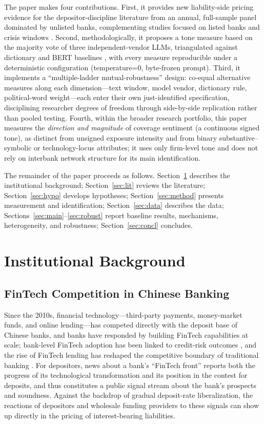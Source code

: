 The paper makes four contributions. First, it provides new
liability-side pricing evidence for the depositor-discipline literature
from an annual, full-sample panel dominated by unlisted banks,
complementing studies focused on listed banks and crisis windows
\parencite{cookson2026runcatalyst, fang2024mediadeposit,
marchetti2025tone}. Second, methodologically, it proposes a tone
measure based on the majority vote of three independent-vendor LLMs,
triangulated against dictionary and BERT baselines
\parencite{gilardi2023chatgpt, huang2023finbert, loughran2011liability},
with every measure reproducible under a deterministic configuration
(temperature=0, byte-frozen prompt). Third, it implements a
``multiple-ladder mutual-robustness'' design: co-equal alternative
measures along each dimension---text window, model vendor, dictionary
rule, political-word weight---each enter their own just-identified
specification, disciplining researcher degrees of freedom through
side-by-side replication rather than pooled testing. Fourth, within the
broader research portfolio, this paper measures the \emph{direction and
magnitude} of coverage sentiment (a continuous signed tone), as distinct
from unsigned exposure intensity and from binary
substantive--symbolic or technology-locus attributes; it uses only
firm-level tone and does not rely on interbank network structure for
its main identification.

The remainder of the paper proceeds as follows.
Section~\ref{sec:inst} describes the institutional background;
Section~\ref{sec:lit} reviews the literature; Section~\ref{sec:hypo}
develops hypotheses; Section~\ref{sec:method} presents measurement and
identification; Section~\ref{sec:data} describes the data;
Sections~\ref{sec:main}--\ref{sec:robust} report baseline results,
mechanisms, heterogeneity, and robustness; Section~\ref{sec:concl}
concludes.

\section{Institutional Background}\label{sec:inst}

\subsection{FinTech Competition in Chinese Banking}
Since the 2010s, financial technology---third-party payments,
money-market funds, and online lending---has competed directly with the
deposit base of Chinese banks, and banks have responded by building
FinTech capabilities at scale; bank-level FinTech adoption has been
linked to credit-risk outcomes \parencite{cheng2020bankfintech}, and
the rise of FinTech lending has reshaped the competitive boundary of
traditional banking \parencite{berg2022fintechlending}. For
depositors, news about a bank's ``FinTech front'' reports both the
progress of its technological transformation and its position in the
contest for deposits, and thus constitutes a public signal stream about
the bank's prospects and soundness. Against the backdrop of gradual
deposit-rate liberalization, the reactions of depositors and wholesale
funding providers to these signals can show up directly in the pricing
of interest-bearing liabilities.

